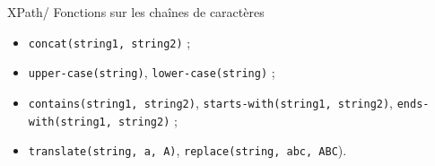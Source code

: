 \documentclass{beamer}
\begin{document}
    \begin{frame}{XPath/ Fonctions sur les chaînes de caractères}
    \Large
    \begin{itemize}
        \item \texttt{concat(string1, string2)} ;
        \bigskip
        \item \texttt{upper-case(string)}, \texttt{lower-case(string)} ;
        \bigskip
        \item \texttt{contains(string1, string2)}, \texttt{starts-with(string1, string2)}, \texttt{ends-with(string1, string2)} ;
        \bigskip
        \item \texttt{translate(string, a, A)}, \texttt{replace(string, abc, ABC}).
    \end{itemize}
        
    \end{frame}
\end{document}
